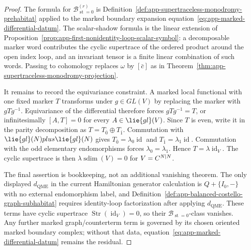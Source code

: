 \begin{proof}
  The formula for
  \(\mathcal B^{(r)}_{\operatorname{st}=0}\) is
  Definition~\ref{def:app-supertraceless-monodromy-prehabitat} applied to
  the marked boundary expansion
  equation~\eqref{eq:app-marked-differential-datum}.  The scalar-shadow
  formula is the linear extension of
  Proposition~\ref{prop:app-first-nonidentity-loop-scalar-symbol}: a
  decomposable marker word contributes the cyclic supertrace of the
  ordered product around the open index loop, and an invariant tensor is a
  finite linear combination of such words.  Passing to cohomology replaces
  \(\omega\) by \([\bar c]\) as in
  Theorem~\ref{thm:app-supertraceless-monodromy-projection}.

  It remains to record the equivariance constraint.  A marked local
  functional with one fixed marker \(T\) transforms under \(g\in GL(V)\)
  by replacing the marker with \(gTg^{-1}\).  Equivariance of the
  differential therefore forces \(gTg^{-1}=T\), or infinitesimally
  \([A,T]=0\) for every \(A\in\lie{gl}(V)\).  Since \(T\) is even, write it
  in the parity decomposition as
  \(T=T_{\bar0}\oplus T_{\bar1}\).  Commutation with
  \(\lie{gl}(N)\oplus\lie{gl}(N)\) gives
  \(T_{\bar0}=\lambda_0\operatorname{id}\) and
  \(T_{\bar1}=\lambda_1\operatorname{id}\).  Commutation with the odd
  elementary endomorphisms forces \(\lambda_0=\lambda_1\).  Hence
  \(T=\lambda\operatorname{id}_V\).  The cyclic supertrace is then
  \(\lambda\operatorname{sdim}(V)=0\) for \(V=C^{N|N}\).

  The final assertion is bookkeeping, not an additional vanishing
  theorem.  The only displayed \(d_{\mathrm{QME}}\) in the current
  Hamiltonian generator calculation is \(Q+\{I_0,-\}\) with no external
  endomorphism label, and
  Definition~\ref{def:app-balanced-costello-graph-subhabitat} requires
  identity-loop factorization after applying \(d_{\mathrm{QME}}\).  These
  terms have cyclic supertrace
  \(\operatorname{Str}(\operatorname{id}_V)=0\), so their
  \(\mathcal B_{\operatorname{st}=0}\)-class vanishes.  Any further
  marked graph/counterterm term is governed by its chosen oriented marked
  boundary complex; without that data,
  equation~\eqref{eq:app-marked-differential-datum} remains the residual.
\end{proof}

